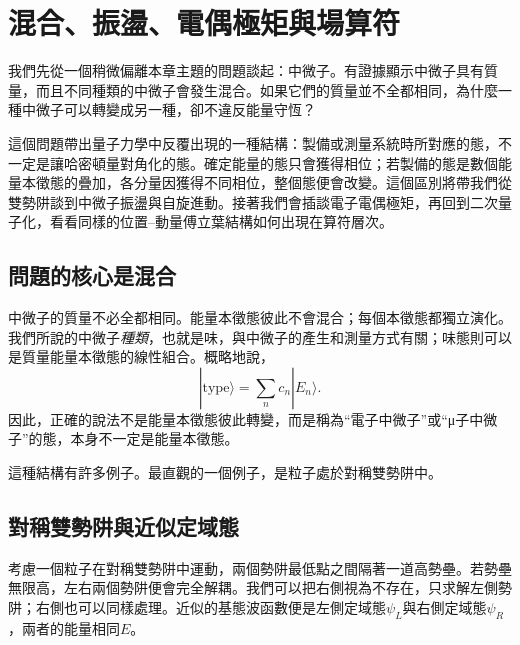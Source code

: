 \chapter{混合、振盪、電偶極矩與場算符}

我們先從一個稍微偏離本章主題的問題談起：中微子。有證據顯示中微子具有質量，而且不同種類的中微子會發生混合。如果它們的質量並不全都相同，為什麼一種中微子可以轉變成另一種，卻不違反能量守恆？

這個問題帶出量子力學中反覆出現的一種結構：製備或測量系統時所對應的態，不一定是讓哈密頓量對角化的態。確定能量的態只會獲得相位；若製備的態是數個能量本徵態的疊加，各分量因獲得不同相位，整個態便會改變。這個區別將帶我們從雙勢阱談到中微子振盪與自旋進動。接著我們會插談電子電偶極矩，再回到二次量子化，看看同樣的位置--動量傅立葉結構如何出現在算符層次。

\section{問題的核心是混合}

中微子的質量不必全都相同。能量本徵態彼此不會混合；每個本徵態都獨立演化。我們所說的中微子\emph{種類}，也就是味，與中微子的產生和測量方式有關；味態則可以是質量能量本徵態的線性組合。概略地說，
\begin{equation}
|\text{type}\rangle = \sum_n c_n |E_n\rangle .
\end{equation}
因此，正確的說法不是能量本徵態彼此轉變，而是稱為``電子中微子''或``{\proseunicodefont μ}子中微子''的態，本身不一定是能量本徵態。

\begin{classroomqa}
\end{classroomqa}

這種結構有許多例子。最直觀的一個例子，是粒子處於對稱雙勢阱中。

\section{對稱雙勢阱與近似定域態}

考慮一個粒子在對稱雙勢阱中運動，兩個勢阱最低點之間隔著一道高勢壘。若勢壘無限高，左右兩個勢阱便會完全解耦。我們可以把右側視為不存在，只求解左側勢阱；右側也可以同樣處理。近似的基態波函數便是左側定域態\(\psi_L\)與右側定域態\(\psi_R\)，兩者的能量相同\(E\)。

